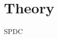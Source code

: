\documentclass[10pt,aspectratio=43]{beamer}
\begin{document}
	\section{Theory}
	
	\begin{frame}{SPDC}
		\begin{minipage}{.45\textwidth}
			\begin{center}
			\end{center}
		\end{minipage}

\end{frame}
\end{document}
